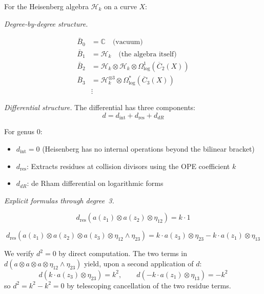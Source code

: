 \begin{theorem}\label{thm:heisenberg-bar-complete}
For the Heisenberg algebra $\mathcal{H}_k$ on a curve $X$:

\noindent\emph{Degree-by-degree structure.}

\begin{align}
\bar{B}_0 &= \mathbb{C} \quad \text{(vacuum)} \\
\bar{B}_1 &= \mathcal{H}_k \quad \text{(the algebra itself)} \\
\bar{B}_2 &= \mathcal{H}_k \otimes \mathcal{H}_k \otimes \Omega^1_{\log}(\overline{C}_2(X)) \\
\bar{B}_3 &= \mathcal{H}_k^{\otimes 3} \otimes \Omega^*_{\log}(\overline{C}_3(X)) \\
&\vdots
\end{align}

\noindent\emph{Differential structure.}
The differential has three components:
\[d = d_{\text{int}} + d_{\text{res}} + d_{dR}\]

For genus 0:
\begin{itemize}
\item $d_{\text{int}} = 0$ (Heisenberg has no internal operations beyond the bilinear bracket)
\item $d_{\text{res}}$: Extracts residues at collision divisors using the OPE coefficient $k$
\item $d_{dR}$: de Rham differential on logarithmic forms
\end{itemize}

\noindent\emph{Explicit formulas through degree~3.}

\[d_{\text{res}}(a(z_1) \otimes a(z_2) \otimes \eta_{12}) = k \cdot 1\]

\[d_{\text{res}}(a(z_1) \otimes a(z_2) \otimes a(z_3) \otimes \eta_{12} \wedge \eta_{23}) = k \cdot a(z_3) \otimes \eta_{23} - k \cdot a(z_1) \otimes \eta_{13}\]

We verify $d^2 = 0$ by direct computation.  The two terms in $d(a \otimes a \otimes a \otimes \eta_{12} \wedge \eta_{23})$ yield, upon a second application of $d$:
\[d(k \cdot a(z_3) \otimes \eta_{23}) = k^2, \qquad d(-k \cdot a(z_1) \otimes \eta_{13}) = -k^2\]
so $d^2 = k^2 - k^2 = 0$ by telescoping cancellation of the two residue terms.
\end{theorem}

